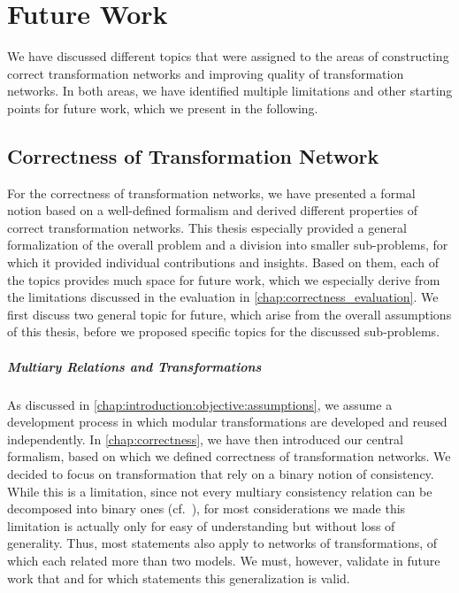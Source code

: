 \chapter{Future Work
}
\label{chap:futurework}

We have discussed different topics that were assigned to the areas of constructing correct transformation networks and improving quality of transformation networks.
In both areas, we have identified multiple limitations and other starting points for future work, which we present in the following.


\section{Correctness of Transformation Network}

For the correctness of transformation networks, we have presented a formal notion based on a well-defined formalism and derived different properties of correct transformation networks.
This thesis especially provided a general formalization of the overall problem and a division into smaller sub-problems, for which it provided individual contributions and insights.
Based on them, each of the topics provides much space for future work, which we especially derive from the limitations discussed in the evaluation in \autoref{chap:correctness_evaluation}.
We first discuss two general topic for future, which arise from the overall assumptions of this thesis, before we proposed specific topics for the discussed sub-problems.

\paragraph{Multiary Relations and Transformations}
\label{chap:futurework:correctness:multiary}
As discussed in \autoref{chap:introduction:objective:assumptions}, we assume a development process in which modular transformations are developed and reused independently.
In \autoref{chap:correctness}, we have then introduced our central formalism, based on which we defined correctness of transformation networks.
We decided to focus on transformation that rely on a binary notion of consistency.
While this is a limitation, since not every multiary consistency relation can be decomposed into binary ones (cf.~\cite{stevens2020BidirectionalTransformationLarge-SoSym}), for most considerations we made this limitation is actually only for easy of understanding but without loss of generality.
Thus, most statements also apply to networks of transformations, of which each related more than two models.
We must, however, validate in future work that and for which statements this generalization is valid.


